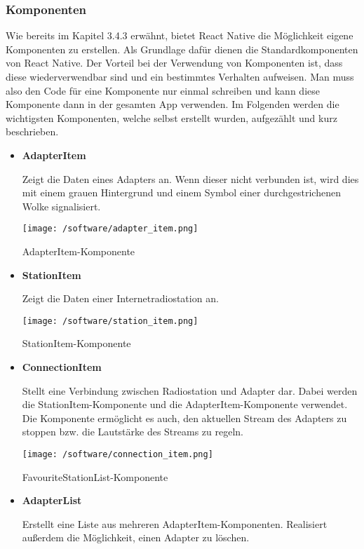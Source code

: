 \documentclass[11pt, twoside]{article}
\begin{document}
\subsubsection{Komponenten}
Wie bereits im Kapitel 3.4.3 erwähnt, bietet React Native die Möglichkeit eigene Komponenten zu erstellen. Als Grundlage dafür dienen die Standardkomponenten von React Native. Der Vorteil bei der Verwendung von Komponenten ist, dass diese wiederverwendbar sind und ein bestimmtes Verhalten aufweisen. Man muss also den Code für eine Komponente nur einmal schreiben und kann diese Komponente dann in der gesamten App verwenden. Im Folgenden werden die wichtigsten Komponenten, welche selbst erstellt wurden, aufgezählt und kurz beschrieben. \newline \\
\begin{itemize}
	\item \textbf{AdapterItem} 
	\par Zeigt die Daten eines Adapters an. Wenn dieser nicht verbunden ist, wird dies mit einem grauen Hintergrund und einem Symbol einer durchgestrichenen Wolke signalisiert.
	\begin{flushleft}
    		\captionsetup{type=figure}
     	\texttt{[image: /software/adapter\_item.png]}
    		\caption{AdapterItem-Komponente}
    	\end{flushleft}
	\item \textbf{StationItem}
	\par Zeigt die Daten einer Internetradiostation an.
	\begin{flushleft}
    		\captionsetup{type=figure}
     	\texttt{[image: /software/station\_item.png]}
    		\caption{StationItem-Komponente}
    	\end{flushleft}
	\item \textbf{ConnectionItem}
	\par Stellt eine Verbindung zwischen Radiostation und Adapter dar. Dabei werden die StationItem-Komponente und die AdapterItem-Komponente verwendet. Die Komponente ermöglicht es auch, den aktuellen Stream des Adapters zu stoppen bzw. die Lautstärke des Streams zu regeln.
	\begin{flushleft}
    		\captionsetup{type=figure}
     	\texttt{[image: /software/connection\_item.png]}
    		\caption{FavouriteStationList-Komponente}
    	\end{flushleft}
	\item \textbf{AdapterList}
	\par Erstellt eine Liste aus mehreren AdapterItem-Komponenten. Realisiert außerdem die Möglichkeit, einen Adapter zu löschen.

\end{itemize}
\end{document}

